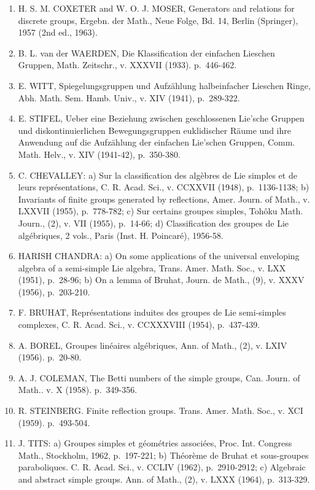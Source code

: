 \begin{enumerate}
\def\labelenumi{(\Roman{enumi})}
\setcounter{enumi}{14}
\item
  H. S. M. COXETER and W. O. J. MOSER, Generators and relations for discrete groups, Ergebn. der Math., Neue Folge, Bd. 14, Berlin (Springer), 1957 (2nd ed., 1963).
\item
  B. L. van der WAERDEN, Die Klassification der einfachen Lieschen Gruppen, Math. Zeitschr., v. XXXVII (1933). p.~446-462.
\item
  E. WITT, Spiegelungsgruppen und Aufzählung halbeinfacher Lieschen Ringe, Abh. Math. Sem. Hamb. Univ., v. XIV (1941), p.~289-322.
\item
  E. STIFEL, Ueber eine Beziehung zwischen geschlossenen Lie'sche Gruppen und diskontinuierlichen Bewegungsgruppen euklidischer Räume und ihre Anwendung auf die Aufzählung der einfachen Lie'schen Gruppen, Comm. Math. Helv., v. XIV (1941-42), p.~350-380.
\item
  C. CHEVALLEY: a) Sur la classification des algèbres de Lie simples et de leurs représentations, C. R. Acad. Sci., v. CCXXVII (1948), p.~1136-1138; b) Invariants of finite groups generated by reflections, Amer. Journ. of Math., v. LXXVII (1955), p.~778-782; c) Sur certains groupes simples, Tohôku Math. Journ., (2), v. VII (1955), p.~14-66; d) Classification des groupes de Lie algébriques, 2 vols., Paris (Inst. H. Poincaré), 1956-58.
\item
  HARISH CHANDRA: a) On some applications of the universal enveloping algebra of a semi-simple Lie algebra, Trans. Amer. Math. Soc., v. LXX (1951), p.~28-96; b) On a lemma of Bruhat, Journ. de Math., (9), v. XXXV (1956), p.~203-210.
\item
  F. BRUHAT, Représentations induites des groupes de Lie semi-simples complexes, C. R. Acad. Sci., v. CCXXXVIII (1954), p.~437-439.
\item
  A. BOREL, Groupes linéaires algébriques, Ann. of Math., (2), v. LXIV (1956). p.~20-80.
\item
  A. J. COLEMAN, The Betti numbers of the simple groups, Can. Journ. of Math.. v. X (1958). p.~349-356.
\item
  R. STEINBERG. Finite reflection groups. Trans. Amer. Math. Soc., v. XCI (1959). p.~493-504.
\item
  J. TITS: a) Groupes simples et géométries associées, Proc. Int. Congress Math., Stockholm, 1962, p.~197-221; b) Théorème de Bruhat et sous-groupes paraboliques. C. R. Acad. Sci., v. CCLIV (1962), p.~2910-2912; c) Algebraic and abstract simple groups. Ann. of Math., (2), v. LXXX (1964), p.~313-329.

\end{enumerate}
